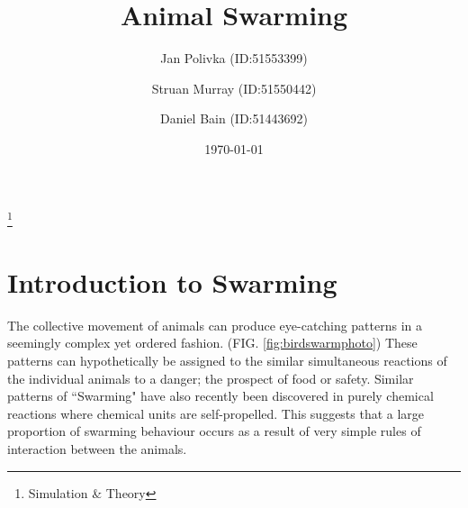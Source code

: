 \documentclass[
reprint,
showpacs,
preprintnumbers,
bibnotes,
amsmath,
amssymb,
aps,
pra,
floatfix,
]{revtex4-1}
\begin{document}
\title{Animal Swarming} %
\thanks{Simulation \& Theory}

\author{Jan Polivka (ID:51553399)}
\author{Struan Murray (ID:51550442)}
\author{Daniel Bain (ID:51443692)}

\date{\today}

\begin{abstract}
\end{abstract}

\maketitle


\section{\label{sec:introduction}Introduction to Swarming}

The collective movement of animals can produce eye-catching patterns in a seemingly complex yet ordered fashion. (FIG. \ref{fig:birdswarmphoto})
These patterns can hypothetically be assigned to the similar simultaneous reactions of the individual animals to a danger; the prospect of food or safety.
Similar patterns of ``Swarming" have also recently been discovered in purely chemical reactions where chemical units are self-propelled.\cite{collectivemotion}
This suggests that a large proportion of swarming behaviour occurs as a result of very simple rules of interaction between the animals.
\end{document}
